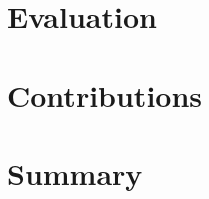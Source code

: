 




\tableofcontents





\chapter{Evaluation}
\chapter{Contributions}
\chapter{Summary}

%
\printbibliography
